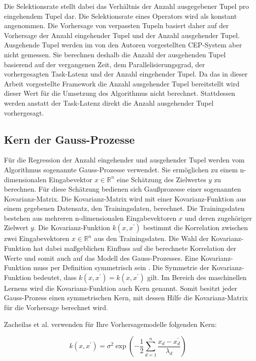 Die Selektionsrate stellt dabei das Verhältnis der Anzahl ausgegebener Tupel pro eingehendem Tupel dar.
Die Selektionsrate eines Operators wird als konstant angenommen.
Die Vorhersage von verpassten Tupeln basiert daher auf der Vorhersage der Anzahl eingehender Tupel und der Anzahl ausgehender Tupel.
Ausgehende Tupel werden im von den Autoren vorgestellten CEP-System aber nicht gemessen.
Sie berechnen deshalb die Anzahl der ausgehenden Tupel basierend auf der vergangenen Zeit, dem Parallelisierungsgrad, der vorhergesagten Task-Latenz und der Anzahl eingehender Tupel.
Da das in dieser Arbeit vorgestellte Framework die Anzahl ausgehender Tupel bereitstellt wird dieser Wert für die Umsetzung des Algorithmus nicht berechnet.
Stattdessen werden anstatt der Task-Latenz direkt die Anzahl ausgehender Tupel vorhergesagt.

\subsection{Kern der Gauss-Prozesse}
Für die Regression der Anzahl eingehender und ausgehender Tupel werden vom Algorithmus sogenannte Gauss-Prozesse verwendet.
Sie ermöglichen zu einem n-dimensionalen Eingabevektor \(x \in \mathbb{R}^n\) eine Schätzung des Zielwertes \(y\) zu berechnen.
Für diese Schätzung bedienen sich Gaußprozesse einer sogenannten Kovarianz-Matrix.
Die Kovarianz-Matrix wird mit einer Kovarianz-Funktion aus einem gegebenen Datensatz, den Trainingsdaten, berechnet.
Die Trainingsdaten bestehen aus mehreren n-dimensionalen Eingabevektoren \(x\) und deren zugehöriger Zielwert \(y\).
Die Kovarianz-Funktion \(k(x,x^\prime)\) bestimmt die Korrelation zwischen zwei Eingabevektoren \(x \in \mathbb{R}^n\) aus den Trainingsdaten.
Die Wahl der Kovarianz-Funktion hat dabei maßgeblichen Einfluss auf die berechnete Korrelation der Werte und somit auch auf das Modell des Gauss-Prozesses.
Eine Kovarianz-Funktion muss per Definition symmetrisch sein \cite{rasmussen2004gaussian}.
Die Symmetrie der Kovarianz-Funktion bedeutet, dass \(k(x,x^\prime) = k(x,x^\prime)\) gilt.
Im Bereich des maschinellen Lernens wird die Kovarianz-Funktion auch Kern genannt.
Somit besitzt jeder Gauss-Prozess einen symmetrischen Kern, mit dessen Hilfe die Kovarianz-Matrix für die Vorhersage berechnet wird.

Zacheilas et al. verwenden für Ihre Vorhersagemodelle folgenden Kern:

\[k(x, x^\prime) = \sigma^2 \exp{\left( - \frac{1}{2} \sum^{n}_{d=1} \frac{x_d-x_{d}^{\prime}}{\lambda_d}\right)}\]

